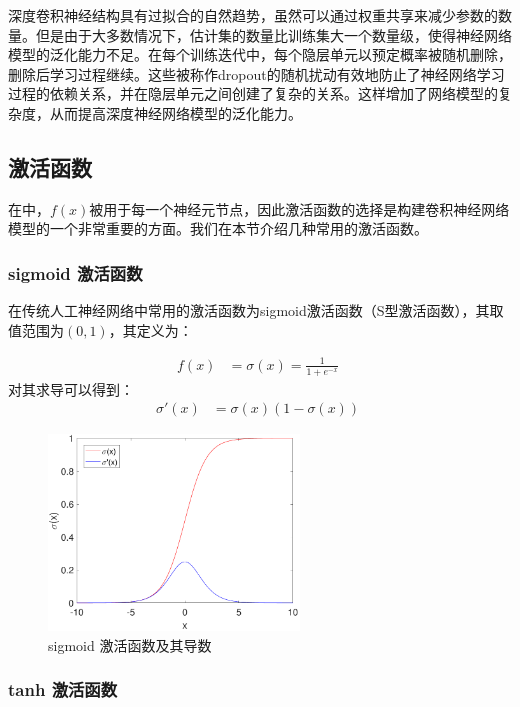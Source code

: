 深度卷积神经结构具有过拟合的自然趋势，虽然可以通过权重共享来减少参数的数量。但是由于大多数情况下，估计集的数量比训练集大一个数量级，使得神经网络模型的泛化能力不足。在每个训练迭代中，每个隐层单元以预定概率被随机删除，删除后学习过程继续。这些被称作dropout的随机扰动有效地防止了神经网络学习过程的依赖关系，并在隐层单元之间创建了复杂的关系。这样增加了网络模型的复杂度，从而提高深度神经网络模型的泛化能力。


\subsection{激活函数}

在中，$f(x)$被用于每一个神经元节点，因此激活函数的选择是构建卷积神经网络模型的一个非常重要的方面。我们在本节介绍几种常用的激活函数。

\subsubsection{sigmoid 激活函数}

在传统人工神经网络中常用的激活函数为sigmoid激活函数（S型激活函数），其取值范围为$(0,1)$，其定义为：

\begin{align}
f(x)&=\sigma(x)=\frac{1}{1+e^{-x}}\;
\end{align}
对其求导可以得到：
\begin{align}
\sigma'(x)&=\sigma(x)\left(1-\sigma(x)\right)\;
\end{align}

\begin{figure}[hbt]
	\centering
	\includegraphics[width=6.67cm]{figures/networks/sigmoid}
	\caption{sigmoid 激活函数及其导数}
	\label{fig:sigmoid}
\end{figure}

\subsubsection{ tanh 激活函数}

